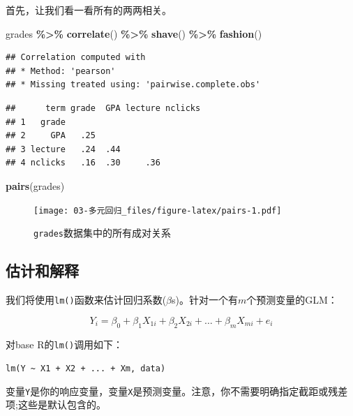 \documentclass[
]{book}
\newenvironment{Shaded}{\begin{snugshade}}{\end{snugshade}}
\newcommand{\FunctionTok}[1]{\textcolor[rgb]{0.13,0.29,0.53}{\textbf{#1}}}
\newcommand{\NormalTok}[1]{#1}
\newcommand{\SpecialCharTok}[1]{\textcolor[rgb]{0.81,0.36,0.00}{\textbf{#1}}}
\begin{document}
首先，让我们看一看所有的两两相关。

\begin{Shaded}
\begin{Highlighting}[]
\NormalTok{grades }\SpecialCharTok{\%\textgreater{}\%}
  \FunctionTok{correlate}\NormalTok{() }\SpecialCharTok{\%\textgreater{}\%}
  \FunctionTok{shave}\NormalTok{() }\SpecialCharTok{\%\textgreater{}\%}
  \FunctionTok{fashion}\NormalTok{()}
\end{Highlighting}
\end{Shaded}

\begin{verbatim}
## Correlation computed with
## * Method: 'pearson'
## * Missing treated using: 'pairwise.complete.obs'
\end{verbatim}

\begin{verbatim}
##      term grade  GPA lecture nclicks
## 1   grade                           
## 2     GPA   .25                     
## 3 lecture   .24  .44                
## 4 nclicks   .16  .30     .36
\end{verbatim}

\begin{Shaded}
\begin{Highlighting}[]
\FunctionTok{pairs}\NormalTok{(grades)}
\end{Highlighting}
\end{Shaded}

\begin{figure}
\centering
\texttt{[image: 03-多元回归\_files/figure-latex/pairs-1.pdf]}
\caption{\label{fig:pairs}\texttt{grades}数据集中的所有成对关系}
\end{figure}

\hypertarget{ux4f30ux8ba1ux548cux89e3ux91ca}{%
\subsection{估计和解释}\label{ux4f30ux8ba1ux548cux89e3ux91ca}}

我们将使用\texttt{lm()}函数来估计回归系数(\(\beta\)s)。针对一个有\(m\)个预测变量的GLM：

\[
Y_i = \beta_0 + \beta_1 X_{1i} + \beta_2 X_{2i} + \ldots + \beta_m X_{mi} + e_i
\]

对base R的\texttt{lm()}调用如下：

\texttt{lm(Y\ \textasciitilde{}\ X1\ +\ X2\ +\ ...\ +\ Xm,\ data)}

变量\texttt{Y}是你的响应变量，变量\texttt{X}是预测变量。注意，你不需要明确指定截距或残差项;这些是默认包含的。
\end{document}
